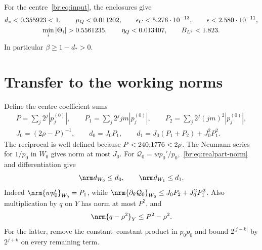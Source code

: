 For the centre~\eqref{br:eq:input}, the enclosures give
\begin{equation}\label{br:eq:spectral-numbers}
 \begin{gathered}
 d_*<\brDinf<1,\qquad \mu_Q<\brMu,\qquad
 \epsilon_C<\brEpsC,\qquad\epsilon<\brEps,\\
 \min_i|\Theta_i|>\brDiagLo,\qquad
 \eta_Q<\brSchur,\qquad B_{L^2}<\brBLtwo.
 \end{gathered}
\end{equation}
In particular $\beta\ge1-d_*>0$.

\section{Transfer to the working norms}\label{br:sec:transfer}
Define the centre coefficient sums
\begin{equation}\label{br:eq:P}
 \begin{gathered}
 P=\sum_j2^j|p_j^{(0)}|,\qquad
 P_1=\sum_j2^jjm|p_j^{(0)}|,\qquad
 P_2=\sum_j2^j(jm)^2|p_j^{(0)}|,\\
 J_0=(2\rho-P)^{-1},\qquad
 d_0=J_0P_1,\qquad
 d_1=J_0(P_1+P_2)+J_0^2P_1^2.
 \end{gathered}
\end{equation}
The reciprocal is well defined because $P<240.1776<2\rho$.
The Neumann series for $1/p_0$ in $W_0$ gives norm at most $J_0$.
For $\mathcal Q_0=wp_0'/p_0$,~\eqref{br:eq:realpart-norm} and differentiation give
\begin{equation}\label{br:eq:d-norms}
 \nrm d_{W_0}\le d_0,\qquad \nrm d_{W_1}\le d_1.
\end{equation}
Indeed $\nrm{wp_0'}_{W_0}=P_1$, while
$\nrm{\partial_\theta \mathcal Q_0}_{W_0}\le J_0P_2+J_0^2P_1^2$.
Also multiplication by $q$ on $Y$ has norm at most $P^2$, and
\begin{equation}\label{br:eq:potential-norm}
 \nrm{q-\rho^2}_Y\le P^2-\rho^2.
\end{equation}
For the latter, remove the constant--constant product in $p_0\overline{p_0}$
and bound $2^{|j-k|}$ by $2^{j+k}$ on every remaining term.

